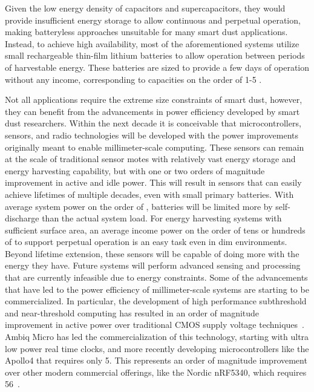Given the low energy density of capacitors and supercapacitors, they would provide insufficient energy storage to allow continuous and perpetual operation, making batteryless approaches unsuitable for many smart dust applications.
Instead, to achieve high availability, most of the aforementioned systems utilize small rechargeable thin-film lithium batteries to allow operation between periods of harvestable energy. These batteries are sized to provide a few days of operation without any income, corresponding to capacities on the order of 1-5 \ssi{\micro\Ah}. 

Not all applications require the extreme size constraints of smart dust, however, they can benefit from the advancements in power efficiency developed by smart dust researchers.
Within the next decade it is conceivable that microcontrollers, sensors, and radio technologies will be developed with the power improvements originally meant to enable millimeter-scale computing.
These sensors can remain at the scale of traditional sensor motes with relatively vast energy storage and energy harvesting capability, but with one or two orders of magnitude improvement in active and idle power.
This will result in sensors that can easily achieve lifetimes of multiple decades, even with small primary batteries. 
With average system power on the order of \ssi{\nano\watt}, batteries will be limited more by self-discharge than the actual system load.
For energy harvesting systems with sufficient surface area, an average income power on the order of tens or hundreds of \ssi{\nano\watt} to support perpetual operation is an easy task even in dim environments. 
Beyond lifetime extension, these sensors will be capable of doing more with the energy they have. Future systems will perform advanced sensing and processing that are currently infeasible due to energy constraints. 
Some of the advancements that have led to the power efficiency of millimeter-scale systems are starting to be commercialized.
In particular, the development of high performance subthreshold and near-threshold computing has resulted in an order of magnitude improvement in active power over traditional CMOS supply voltage techniques~\cite{zhai2009energy, dreslinski2010near}.
Ambiq Micro has led the commercialization of this technology, starting with ultra low power real time clocks, and more recently developing microcontrollers like the Apollo4 that requires only 5\ssi[per-mode=symbol]{\micro\ampere\per\mega\hertz}.
This represents an order of magnitude improvement over other modern commercial offerings, like the Nordic nRF5340, which requires 56\ssi[per-mode=symbol]{\micro\ampere\per\mega\hertz}~\cite{nrf5340}.

